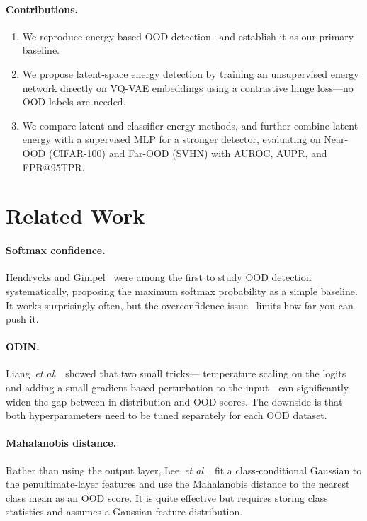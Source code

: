 \documentclass[10pt,twocolumn,letterpaper]{article}
\begin{document}
\paragraph{Contributions.}
\begin{enumerate}
  \item We reproduce energy-based OOD detection~\cite{liu2020energy}
        and establish it as our primary baseline.
  \item We propose latent-space energy detection by training an
        unsupervised energy network directly on VQ-VAE embeddings
        using a contrastive hinge loss---no OOD labels are needed.
  \item We compare latent and classifier energy methods, and further
        combine latent energy with a supervised MLP for a stronger
        detector, evaluating on Near-OOD (CIFAR-100) and Far-OOD
        (SVHN) with AUROC, AUPR, and FPR@95TPR.
\end{enumerate}

\section{Related Work}

\paragraph{Softmax confidence.}
Hendrycks and Gimpel~\cite{hendrycks2017baseline} were among the first
to study OOD detection systematically, proposing the maximum softmax
probability as a simple baseline. It works surprisingly often, but the
overconfidence issue~\cite{nguyen2015deep} limits how far you can push it.

\paragraph{ODIN.}
Liang~\emph{et al.}~\cite{liang2018odin} showed that two small tricks---
temperature scaling on the logits and adding a small gradient-based
perturbation to the input---can significantly widen the gap between
in-distribution and OOD scores. The downside is that both hyperparameters
need to be tuned separately for each OOD dataset.

\paragraph{Mahalanobis distance.}
Rather than using the output layer, Lee~\emph{et al.}~\cite{lee2018mahalanobis}
fit a class-conditional Gaussian to the penultimate-layer features and
use the Mahalanobis distance to the nearest class mean as an OOD score.
It is quite effective but requires storing class statistics and assumes
a Gaussian feature distribution.
\end{document}

